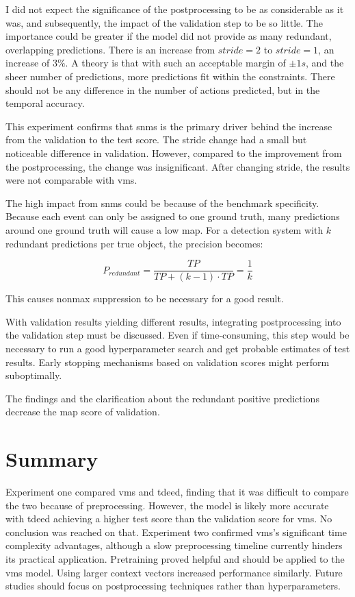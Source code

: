 I did not expect the significance of the postprocessing to be as considerable as it was, and subsequently, the impact of the validation step to be so little. The importance could be greater if the model did not provide as many redundant, overlapping predictions. There is an increase from $stride=2$ to $stride=1$, an increase of $3\%$. A theory is that with such an acceptable margin of $\pm1s$, and the sheer number of predictions, more predictions fit within the constraints. There should not be any difference in the number of actions predicted, but in the temporal accuracy. 

This experiment confirms that \acrshort{snms} is the primary driver behind the increase from the validation to the test score. The stride change had a small but noticeable difference in validation. However, compared to the improvement from the postprocessing, the change was insignificant. After changing stride, the results were not comparable with \acrshort{vms}. 

The high impact from \acrshort{snms} could be because of the benchmark specificity. Because each event can only be assigned to one ground truth, many predictions around one ground truth will cause a low \acrlong{map}. For a detection system with $k$ redundant predictions per true object, the precision becomes:

\[P_{redundant} = \frac{TP}{TP + (k-1) \cdot TP} = \frac{1}{k}\]

This causes nonmax suppression to be necessary for a good result.  

With validation results yielding different results, integrating postprocessing into the validation step must be discussed. Even if time-consuming, this step would be necessary to run a good hyperparameter search and get probable estimates of test results. Early stopping mechanisms based on validation scores might perform suboptimally. 

The findings and the clarification about the redundant positive predictions decrease the \acrshort{map} score of validation.

\section{Summary}

Experiment one compared \acrfull{vms} and \acrfull{tdeed}, finding that it was difficult to compare the two because of preprocessing. However, the model is likely more accurate with \acrshort{tdeed} achieving a higher test score than the validation score for \acrshort{vms}. No conclusion was reached on that. Experiment two confirmed \acrshort{vms}'s significant time complexity advantages, although a slow preprocessing timeline currently hinders its practical application. Pretraining proved helpful and should be applied to the \acrshort{vms} model. Using larger context vectors increased performance similarly. Future studies should focus on postprocessing techniques rather than hyperparameters. 
